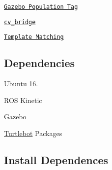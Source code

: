 \begin{DoxyItemize}
\item \href{http://gazebosim.org/tutorials?tut=model_population&cat=build_world}{\tt Gazebo Population Tag}
\item \href{http://wiki.ros.org/cv_bridge/Tutorials/UsingCvBridgeToConvertBetweenROSImagesAndOpenCVImages}{\tt cv\+\_\+bridge}
\item \href{https://docs.opencv.org/master/de/da9/tutorial_template_matching.html}{\tt Template Matching}
\end{DoxyItemize}

\subsection*{Dependencies}


\begin{DoxyItemize}
\item Ubuntu 16.
\item R\+OS Kinetic
\item Gazebo
\item \hyperlink{classTurtlebot}{Turtlebot} Packages
\end{DoxyItemize}

\subsection*{Install Dependences}


